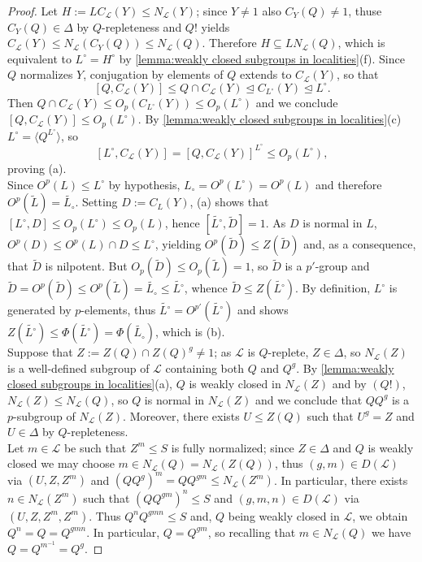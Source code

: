 \documentclass{amsart}
\numberwithin{equation}{section}
\theoremstyle{definition}
\theoremstyle{subresult}
\theoremstyle{caseresult}
\renewcommand{\L}{\mathcal{L}}
\newcommand{\norm}{\trianglelefteq}
\newcommand{\inv}{^{-1}}
\newcommand{\wde}{\widetilde}
\newcommand{\<}{\langle}
\renewcommand{\>}{\rangle}
\begin{document}
\begin{proof}
	
	Let $H:= LC_\L(Y) \le N_\L(Y)$; since $Y \ne 1$ also $C_Y(Q) \ne 1$, thuse $C_Y(Q) \in \Delta$ by $Q$-repleteness and $Q!$ yields $C_\L(Y) \le N_\L(C_Y(Q)) \le N_\L(Q)$. Therefore $H \subseteq LN_\L(Q)$, which is equivalent to $L^\circ =H^\circ$ by \ref{lemma:weakly closed subgroups in localities}(f).  Since $Q $ normalizes $Y$,  conjugation by elements of $Q$ extends to $C_\L(Y)$, so that
	\[
	[Q,C_\L(Y)] \le Q \cap C_\L(Y) \norm C_{L^\circ}(Y) \norm L^\circ.
	\]
	Then $Q \cap C_\L(Y) \le O_p(C_{L^\circ}(Y)) \le O_p(L^\circ)$ and we conclude $[Q,C_\L(Y)] \le O_p(L^\circ)$. By \ref{lemma:weakly closed subgroups in localities}(c) $L^\circ = \< Q^{L^\circ} \>$, so
	\[
	[L^\circ,C_\L(Y)] = [Q,C_\L(Y)]^{L^\circ} \le O_p(L^\circ),
	\]
	proving (a).\\
	
	Since $O^p(L) \le L^\circ$ by hypothesis, $L_\circ = O^p(L^\circ) = O^p(L)$ and therefore $O^p(\wde{L}) = \wde{L_\circ}$. Setting $D:= C_L(Y)$, (a) shows that $[L^\circ, D] \le O_p(L^\circ) \le O_p(L)$, hence $[\wde{L^\circ},\wde{D}]=1$. As $D$ is normal in $L$, $O^p(D) \le O^p(L) \cap D \le L^\circ$, yielding $O^p(\wde{D}) \le Z(\wde{D})$ and, as a consequence, that $\wde{D}$ is nilpotent. But $O_p(\wde{D}) \le O_p(\wde{L}) = 1$, so $\wde{D}$ is a $p'$-group and $\wde{D} = O^p(\wde{D}) \le O^p(\wde{L}) = \wde{L_\circ} \le \wde{L^\circ}$, whence $\wde{D} \le Z(\wde{L^\circ})$. By definition, $L^\circ$ is generated by $p$-elements, thus $\wde{L^\circ} = O^{p'}(\wde{L^\circ})$ and \cite[Lemma 1.7(a),(b)]{Meier-Stell-Stroth:2012} shows $Z(\wde{L^\circ}) \le \Phi(\wde{L^\circ})  =\Phi(\wde{L_\circ})$, which is (b).\\
	
	Suppose that $Z:= Z(Q) \cap Z(Q)^g \ne 1$; as $\L$ is $Q$-replete, $Z \in \Delta$, so $N_\L(Z)$ is a well-defined subgroup of $\L$ containing both $Q$ and $Q^g$. By \ref{lemma:weakly closed subgroups in localities}(a), $Q$ is weakly closed in $N_\L(Z)$ and by $(Q!)$, $N_\L(Z) \le N_\L(Q)$, so $Q$ is normal in $N_\L(Z)$ and we conclude that $QQ^g$ is a $p$-subgroup of $N_\L(Z)$. Moreover, there exists $U \le Z(Q)$ such that $U^g=Z$ and $U \in \Delta$ by $Q$-repleteness.\\
	Let $m \in \L$ be such that $Z^m \le S$ is fully normalized; since $Z \in \Delta$ and $Q$ is weakly closed we may choose $m \in N_\L(Q) = N_\L(Z(Q))$, thus $(g,m) \in D(\L)$ via $(U,Z,Z^m)$ and $(QQ^g)^m =Q Q^{gm} \le N_\L(Z^m)$. In particular, there exists $n \in N_\L(Z^m)$ such that $(QQ^{gm})^n \le S$ and $(g,m,n) \in D(\L)$ via $(U,Z,Z^m,Z^m)$. Thus $Q^n Q^{gmn} \le S$ and, $Q$ being weakly closed in $\L$, we obtain $Q^n = Q = Q^{gmn}$. In particular, $Q=Q^{gm}$, so recalling that $m \in N_\L(Q)$ we have $Q=Q^{m\inv} =Q^g$.
\end{proof}
\end{document}
